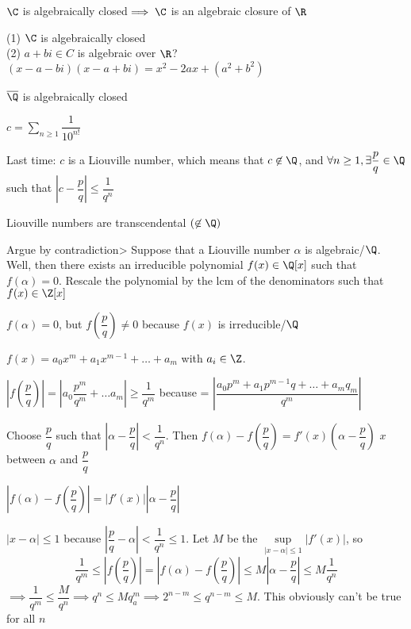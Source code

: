 \documentclass[10pt]{article}
\begin{document}
\begin{exm*}
    $\C$ is algebraically closed$\implies \C$ is an algebraic closure of $\R$
\end{exm*}
(1) $\C$ is algebraically closed\\
(2) $a + bi \in C$ is algebraic over $\R$? $(x - a - bi)(x - a + bi) = x^2 - 2ax + (a^2 + b^2)$

\begin{exm*}
    $\overline{\Q}$ is algebraically closed
\end{exm*}

\begin{exm*}
    $c = \sum\limits_{n \geq 1} \dfrac{1}{10^{n!}}$
\end{exm*}
Last time: $c$ is a Liouville number, which means that $c\not\in\Q$, and $\forall n \geq 1, \exists \dfrac{p}{q} \in \Q$ such that $\left| c - \dfrac{p}{q}\right| \leq \dfrac{1}{q^n}$

\begin{lem}
    Liouville numbers are transcendental $(\not\in \Q)$
\end{lem}
Argue by contradiction> Suppose that a Liouville number $\alpha$ is algebraic/$\Q$. Well, then there exists an irreducible polynomial $f(x) \in \Q[x]$ such that $f(\alpha) = 0$. Rescale the polynomial by the lcm of the denominators such that $f(x) \in \Z[x]$

$f(\alpha) = 0$, but $f(\dfrac{p}{q}) \neq 0$ because $f(x)$ is irreducible/$\Q$

$f(x) = a_0x^m + a_1 x^{m-1} + \ldots + a_m$ with $a_i \in \Z$.

$\left|f(\dfrac{p}{q})\right| = |a_0 \dfrac{p^m}{q^m} + \ldots a_m| \geq \dfrac{1}{q^m}$ because = $\left|\dfrac{a_0p^m + a_1p^{m-1}q + \ldots + a_mq_m}{q^m}\right|$

Choose $\dfrac{p}{q}$ such that $\left| \alpha - \dfrac{p}{q}\right| < \dfrac{1}{q^n}$. Then $f(\alpha) - f(\dfrac{p}{q}) = f'(x)(\alpha - \dfrac{p}{q})$ $x$ between $\alpha$ and $\dfrac{p}{q}$

$\left|f(\alpha) - f(\dfrac{p}{q})\right|  = \left|f'(x)\right|\left|\alpha - \dfrac{p}{q}\right|$ 

$|x - \alpha| \leq 1$ because $\left| \dfrac{p}{q} - \alpha\right| < \dfrac{1}{q^n} \leq 1$. Let $M$ be the $\sup\limits_{|x - \alpha| \leq 1}\left|f'(x)\right|$, so $$\dfrac{1}{q^m} \leq \left|f(\dfrac{p}{q})\right| = \left|f(\alpha) - f(\dfrac{p}{q})\right| \leq M\left| \alpha - \dfrac{p}{q}\right| \leq M\dfrac{1}{q^n}$$
$\implies \dfrac{1}{q^m} \leq \dfrac{M}{q^n} \implies q^n \leq Mq_a^m \implies 2^{n-m } \leq q^{n-m} \leq M$. This obviously can't be true for all $n$
\end{document}
